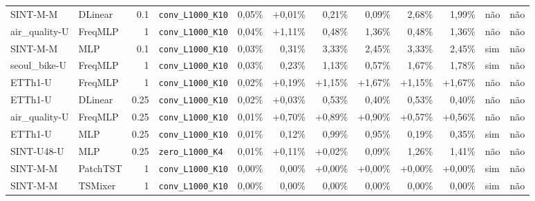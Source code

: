 \begin{longtable}{llrlrrrrrrll}
SINT-M-M & DLinear & 0.1 & \texttt{conv\_\allowbreak{}L1000\_\allowbreak{}K10} & \textminus{}0,05\% & +0,01\% & \textminus{}0,21\% & \textminus{}0,09\% & \textminus{}2,68\% & \textminus{}1,99\% & n\~ao & n\~ao \\
air\_quality-U & FreqMLP & 1 & \texttt{conv\_\allowbreak{}L1000\_\allowbreak{}K10} & \textminus{}0,04\% & +1,11\% & \textminus{}0,48\% & \textminus{}1,36\% & \textminus{}0,48\% & \textminus{}1,36\% & n\~ao & n\~ao \\
SINT-M-M & MLP & 0.1 & \texttt{conv\_\allowbreak{}L1000\_\allowbreak{}K10} & \textminus{}0,03\% & \textminus{}0,31\% & \textminus{}3,33\% & \textminus{}2,45\% & \textminus{}3,33\% & \textminus{}2,45\% & sim & n\~ao \\
seoul\_bike-U & FreqMLP & 1 & \texttt{conv\_\allowbreak{}L1000\_\allowbreak{}K10} & \textminus{}0,03\% & \textminus{}0,23\% & \textminus{}1,13\% & \textminus{}0,57\% & \textminus{}1,67\% & \textminus{}1,78\% & sim & n\~ao \\
ETTh1-U & FreqMLP & 1 & \texttt{conv\_\allowbreak{}L1000\_\allowbreak{}K10} & \textminus{}0,02\% & +0,19\% & +1,15\% & +1,67\% & +1,15\% & +1,67\% & n\~ao & n\~ao \\
ETTh1-U & DLinear & 0.25 & \texttt{conv\_\allowbreak{}L1000\_\allowbreak{}K10} & \textminus{}0,02\% & +0,03\% & \textminus{}0,53\% & \textminus{}0,40\% & \textminus{}0,53\% & \textminus{}0,40\% & n\~ao & n\~ao \\
air\_quality-U & FreqMLP & 0.25 & \texttt{conv\_\allowbreak{}L1000\_\allowbreak{}K10} & \textminus{}0,01\% & +0,70\% & +0,89\% & +0,90\% & +0,57\% & +0,56\% & n\~ao & n\~ao \\
ETTh1-U & MLP & 0.25 & \texttt{conv\_\allowbreak{}L1000\_\allowbreak{}K10} & \textminus{}0,01\% & \textminus{}0,12\% & \textminus{}0,99\% & \textminus{}0,95\% & \textminus{}0,19\% & \textminus{}0,35\% & sim & n\~ao \\
SINT-U48-U & MLP & 0.25 & \texttt{zero\_\allowbreak{}L1000\_\allowbreak{}K4} & \textminus{}0,01\% & +0,11\% & +0,02\% & \textminus{}0,09\% & \textminus{}1,26\% & \textminus{}1,41\% & n\~ao & n\~ao \\
SINT-M-M & PatchTST & 1 & \texttt{conv\_\allowbreak{}L1000\_\allowbreak{}K10} & \textminus{}0,00\% & \textminus{}0,00\% & +0,00\% & +0,00\% & +0,00\% & +0,00\% & sim & n\~ao \\
SINT-M-M & TSMixer & 1 & \texttt{conv\_\allowbreak{}L1000\_\allowbreak{}K10} & \textminus{}0,00\% & \textminus{}0,00\% & \textminus{}0,00\% & \textminus{}0,00\% & \textminus{}0,00\% & \textminus{}0,00\% & sim & n\~ao \\

\end{longtable}
